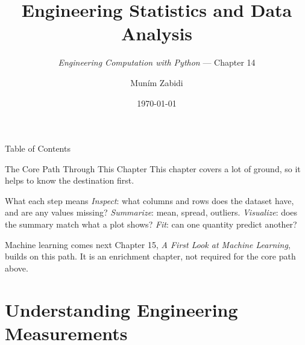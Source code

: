 \documentclass[9pt,aspectratio=169,xcolor=table]{beamer}
\title{Engineering Statistics and Data Analysis}
\subtitle{\emph{Engineering Computation with Python} --- Chapter 14}
\author{Mun\'{i}m Zabidi}
\institute{\color{primary}Faculty of Electrical Engineering, Universiti Teknologi Malaysia}
\date{\today}
\begin{document}
\titlepage

\begin{frame}{Table of Contents}
    \tableofcontents
\end{frame}

\begin{frame}{The Core Path Through This Chapter}
    \leavevmode
    This chapter covers a lot of ground, so it helps to know the
    destination first.

    \vspace{3mm}
    \begin{center}
    \end{center}

    \vspace{3mm}
    \begin{block}{What each step means}
        \small
        \emph{Inspect}: what columns and rows does the dataset have, and
        are any values missing? \quad
        \emph{Summarize}: mean, spread, outliers. \quad
        \emph{Visualize}: does the summary match what a plot shows?
        \quad \emph{Fit}: can one quantity predict another?
    \end{block}

    \vspace{2mm}
    \begin{alertblock}{Machine learning comes next}
        Chapter 15, \emph{A First Look at Machine Learning}, builds on
        this path. It is an enrichment chapter, \alert{not required} for
        the core path above.
    \end{alertblock}
\end{frame}

\section{Understanding Engineering Measurements}
\end{document}
